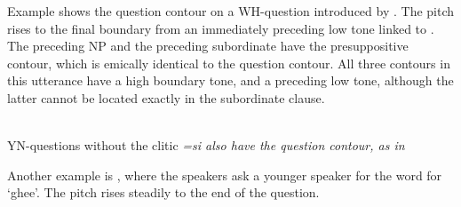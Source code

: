 Example   shows the question contour on a WH-question introduced by . The pitch rises to the final boundary from an immediately preceding low tone linked to . The preceding NP  and the preceding subordinate  have the presuppositive contour, which is emically identical to the question contour. All three contours in this utterance have a high boundary tone, and a preceding low tone, although the latter cannot be located exactly in the subordinate clause.


 \\
YN-questions without the clitic \em =si \em also have the question contour, as in 



Another example is , where the speakers ask a younger speaker for the word for `ghee'. The pitch rises steadily to the end of the question.


